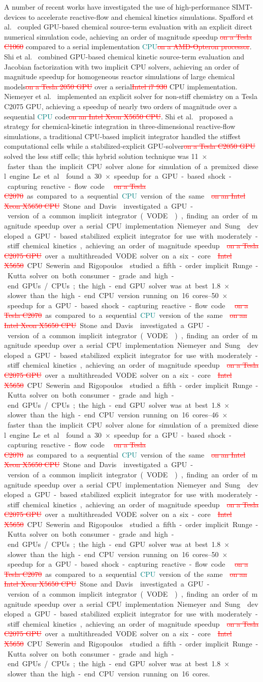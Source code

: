 \documentclass[12pt,number,sort&compress,preprint]{elsarticle}
\newcommand{\add}[1]{{\sloppy\textcolor{teal}{#1}}}  %
\newcommand{\delete}[1]{\sloppy\textcolor{red}{\sout{#1}}} %
\begin{document}
A number of recent works have investigated the use of high-performance SIMT-devices to accelerate reactive-flow and chemical kinetics simulations.
Spafford et al.~\cite{Spafford:2010aa} coupled GPU-based chemical source-term evaluation with an explicit direct numerical simulation code, achieving an order of magnitude speedup \delete{on a Tesla C1060} compared to a serial implementation \add{CPU}\delete{on a AMD-Opteron processor}.
Shi et al.~\cite{Shi:2011aa} combined GPU-based chemical kinetic source-term evaluation and Jacobian factorization with two implicit CPU solvers, achieving an order of magnitude speedup for homogeneous reactor simulations of large chemical models\delete{on a Tesla 2050 GPU} over a serial\delete{Intel i7 930} CPU implementation.
Niemeyer et al.~\cite{Niemeyer:2011aa} implemented an explicit solver for non-stiff chemistry on a Tesla C2075 GPU, achieving a speedup of nearly two orders of magnitude over a sequential \add{CPU} code\delete{on an Intel Xeon X5650 CPU}.
Shi et al.~\cite{Shi:2012aa} proposed a strategy for chemical-kinetic integration in three-dimensional reactive-flow simulations, a traditional CPU-based implicit integrator handled the stiffest computational cells while a stabilized-explicit GPU-solver\delete{on a Tesla C2050 GPU} solved the less stiff cells; this hybrid solution technique was \SIrange{11}{46}{$\times$} faster than the implicit CPU solver alone for simulation of a premixed diesel engine.
Le et al.~\cite{Le2013596} found a \SIrange{30}{50}{$\times$} speedup for a GPU-based shock-capturing reactive-flow code\delete{ on a Tesla C2070} as compared to a sequential \add{CPU} version of the same\delete{on an Intel Xeon X5650 CPU}.
Stone and Davis~\cite{Stone:2013aa} investigated a GPU-version of a common implicit integrator (VODE~\cite{Brown:1989vl}), finding an order of magnitude speedup over a serial CPU implementation.
Niemeyer and Sung~\cite{Niemeyer:2014aa} developed a GPU-based stabilized explicit integrator for use with moderately-stiff chemical kinetics, achieving an order of magnitude speedup\delete{on a Tesla C2075 GPU} over a multithreaded VODE solver on a six-core\delete{Intel X5650} CPU.
Sewerin and Rigopoulos~\cite{Sewerin20151375} studied a fifth-order implicit Runge-Kutta solver on both consumer-grade and high-end GPUs\slash CPUs; the high-end GPU solver was at best \SI{1.8}{$\times$} slower than the high-end CPU version running on \num{16} cores.
\end{document}
